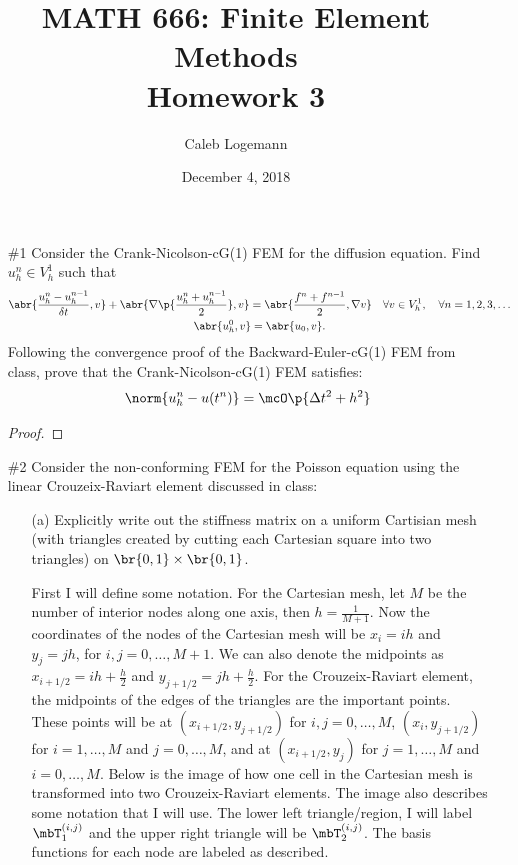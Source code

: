 \documentclass[11pt, titlepage]{article}
\author{Caleb Logemann}
\title{MATH 666: Finite Element Methods \\ Homework 3}
\date{December 4, 2018}
\begin{document}
\maketitle

%
\begin{enumerate}
  \item[\#1]
    Consider the Crank-Nicolson-cG(1) FEM for the diffusion equation.
    Find $u^n_h \in V^1_h$ such that
    \begin{gather*}
      \abr{\frac{u^n_h - u^{n-1}_h}{\delta t}, v} +
      \abr{\nabla \p{\frac{u^n_h + u^{n-1}_h}{2}}, v} = 
      \abr{\frac{f^n + f^{n-1}}{2}, \nabla v}
      \quad \forall v \in V^1_h, \quad \forall n = 1, 2, 3, \ldots \\
      \abr{u^0_h, v} = \abr{u_0, v}.
    \end{gather*}
    Following the convergence proof of the Backward-Euler-cG(1) FEM from class,
    prove that the Crank-Nicolson-cG(1) FEM satisfies:
    \[
      \norm{u^n_h - u(t^n)} = \mcO\p{\Delta t^2 + h^2}
    \]

    \begin{proof}
      
    \end{proof}

  \item[\#2] %
    Consider the non-conforming FEM for the Poisson equation using the linear
    Crouzeix-Raviart element discussed in class:
    \begin{enumerate}
      \item[(a)] %
        Explicitly write out the stiffness matrix on a uniform Cartisian mesh
        (with triangles created by cutting each Cartesian square into two
        triangles) on $\br{0,1} \times \br{0, 1}$.

        First I will define some notation.
        For the Cartesian mesh, let $M$ be the number of interior nodes along
        one axis, then $h = \frac{1}{M+1}$.
        Now the coordinates of the nodes of the Cartesian mesh will be
        $x_i = ih$ and $y_j = jh$, for $i, j = 0, \ldots, M+1$.
        We can also denote the midpoints as $x_{i+1/2} = ih + \frac{h}{2}$ and $y_{j+1/2} = jh + \frac{h}{2}$.
        For the Crouzeix-Raviart element, the midpoints of the edges of the
        triangles are the important points.
        These points will be at $(x_{i+1/2}, y_{j+1/2})$ for $i, j = 0, \ldots, M$,
        $(x_i, y_{j+1/2})$ for $i = 1, \ldots, M$ and $j = 0, \ldots, M$, and at
        $(x_{i+1/2}, y_{j})$ for $j = 1, \ldots, M$ and $i = 0, \ldots, M$.
        Below is the image of how one cell in the Cartesian mesh is transformed
        into two Crouzeix-Raviart elements.
        The image also describes some notation that I will use.
        The lower left triangle/region, I will label $\mbT^{(i, j)}_1$ and the upper
        right triangle will be $\mbT^{(i, j)}_2$.
        The basis functions for each node are labeled as described.


\end{enumerate}
\end{enumerate}
\end{document}
